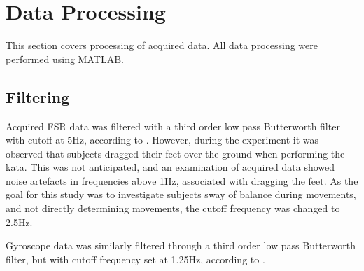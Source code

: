 \section{Data Processing}
This section covers processing of acquired data. All data processing were performed using MATLAB. 

\subsection{Filtering} \label{subsec:filtering}


Acquired FSR data was filtered with a third order low pass Butterworth filter with cutoff at 5Hz, according to \cite{Prieto1996}. 
However, during the experiment it was observed that subjects dragged their feet over the ground when performing the kata. This was not anticipated, and an examination of acquired data showed noise artefacts in frequencies above 1Hz, associated with dragging the feet. As the goal for this study was to investigate subjects sway of balance during movements, and not directly determining movements, the cutoff frequency was changed to 2.5Hz.%

Gyroscope data was similarly filtered through a third order low pass Butterworth filter, but with cutoff frequency set at 1.25Hz, according to \cite{Alberts2015}. 




